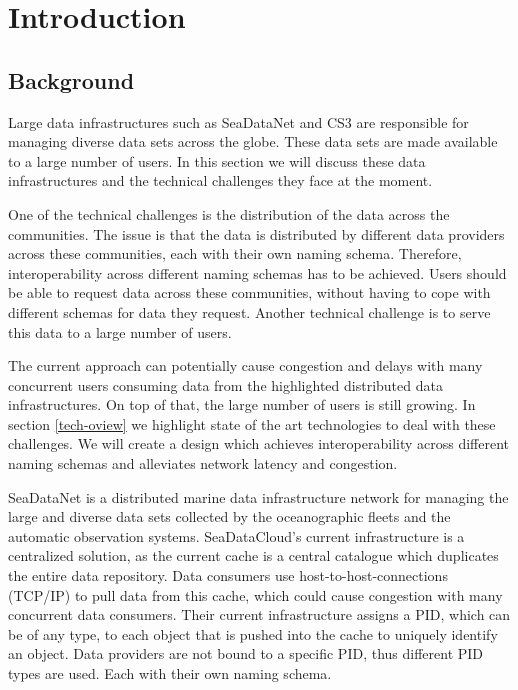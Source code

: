 \section{Introduction}

\subsection{Background}
\label{introduction-background}
Large data infrastructures such as SeaDataNet and CS3 are responsible for managing diverse data sets across the globe. These data sets are made available to a large number of users. In this section we will discuss these data infrastructures and the technical challenges they face at the moment.

One of the technical challenges is the distribution of the data across the communities. The issue is that the data is distributed by different data providers across these communities, each with their own
naming schema. Therefore, interoperability across different naming schemas has to be achieved. Users should be able to request data across these communities, without having to cope with different schemas for data they request. Another technical challenge is to serve this data to a large number of users. 

The current approach can potentially cause congestion and delays with
many concurrent users consuming data from the highlighted distributed data infrastructures. On top of that, the large number of users is still growing. In section \ref{tech-oview} we highlight state of the art technologies to deal with these challenges. We will create a design which achieves interoperability across different naming schemas and alleviates network latency and congestion.

SeaDataNet is a distributed marine data infrastructure network for managing the large and diverse data sets collected by the oceanographic fleets and the automatic observation systems.
SeaDataCloud's current infrastructure is a centralized solution, as the current cache is a central catalogue which duplicates the entire data repository. Data consumers use host-to-host-connections (TCP/IP) to pull data from this cache, which could cause congestion with many concurrent data consumers.
Their current infrastructure assigns a PID, which can be of any type, to each object that is pushed into the cache to uniquely identify an object. Data providers are not bound to a specific PID, thus different PID types are used. Each with their own naming schema.
 
